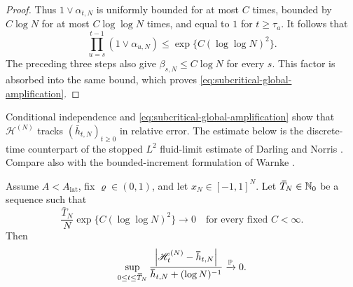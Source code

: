 \documentclass[11pt,reqno,a4paper]{article}
\newcommand{\Pp}{\P}
\begin{document}
\begin{proof}
  Thus $1\vee\alpha_{t,N}$ is uniformly bounded for at most $C$ times,
  bounded by $C\log N$ for at most $C\log\log N$ times, and equal to $1$ for
  $t\geq\tau_a$. It follows that
  \begin{equation*}
    \prod_{u=s}^{t-1}(1\vee\alpha_{u,N})
    \leq
    \exp\{C(\log\log N)^2\}.
  \end{equation*}
  The preceding three steps also give $\beta_{s,N}\leq C\log N$ for every
  $s$. This factor is absorbed into the same bound, which proves
  \cref{eq:subcritical-global-amplification}.
\end{proof}

Conditional independence and \cref{eq:subcritical-global-amplification} show
that $\mathscr H^{(N)}$ tracks $(\bar h_{t,N})_{t\geq0}$ in relative error.
The estimate below is the discrete-time counterpart of the stopped $L^2$
fluid-limit estimate of Darling and Norris \cite{darling-norris2008}. Compare
also with the bounded-increment formulation of Warnke \cite{warnke2019}.
\begin{proposition}
\label{prop:subcritical-exact-radius-concentration}
  Assume $A<A_{\mathrm{lat}}$, fix $\varrho\in(0,1)$, and let
  $x_N\in[-1,1]^N$. Let $\bar T_N\in\N_0$ be a sequence such that
  \begin{equation*}
    \frac{\bar T_N}{N}\exp\{C(\log\log N)^2\}\to0
    \quad\mbox{for every fixed }C<\infty .
  \end{equation*}
  Then
  \begin{equation}\label{eq:subcritical-exact-radius-concentration}
    \sup_{0\leq t\leq \bar T_N}
    \frac{
      \abs{\mathscr H_t^{(N)}-\bar h_{t,N}}
    }{
      \bar h_{t,N}+(\log N)^{-1}
    }
    \xrightarrow{\Pp}0 .
  \end{equation}
\end{proposition}
\end{document}
